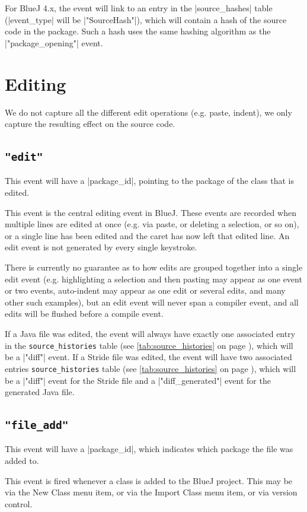 \documentclass{report}
\newcommand{\myref}[1]{\autoref{#1} on page \pageref*{#1}}
\newcommand{\tabref}[1]{\lstinline|#1| table (see \myref{tab:#1})}
\begin{document}
For BlueJ 4.x, the event will link to an entry in the |source_hashes| table
(|event_type| will be |"SourceHash"|), which will contain a hash of
the source code in the package.  Such a hash uses the same hashing algorithm
as the |"package_opening"| event.


\section{Editing}

We do not capture all the different edit operations (e.g. paste, indent), we
only capture the resulting effect on the source code.

\subsection{\lstinline!"edit"!}

This event will have a |package_id|, pointing to the package of the class that
is edited.

This event is the central editing event in BlueJ.  These events are recorded
when multiple lines are edited at once (e.g. via paste, or deleting a
selection, or so on), or a single line has been edited and the caret
has now left that edited line.  An edit event is not generated by every single
keystroke.

There is currently no guarantee as to how edits are grouped together into a single edit
event (e.g. highlighting a selection and then pasting may appear as one event
or two events, auto-indent may appear as one edit or several edits, and many
other such examples), but an edit event will never span a compiler event, and
all edits will be flushed before a compile event.

If a Java file was edited, the event will always have exactly one associated entry in the
\tabref{source_histories}, which will be a |"diff"| event.  If a Stride file was edited,
the event will have two associated entries \tabref{source_histories}, which will be a |"diff"| event
for the Stride file and a |"diff_generated"| event for the generated Java file.

\subsection{\lstinline!"file_add"!}

This event will have a |package_id|, which indicates which package the file
was added to.

This event is fired whenever a class is added to the BlueJ project.  This may
be via the New Class menu item, or via the Import Class menu item, or via
version control.
\end{document}
